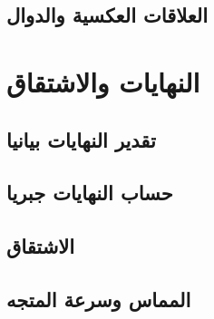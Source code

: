 \documentclass[12pt]{article}
\begin{document}
        \subsection{العلاقات العكسية والدوال}
    \section{النهايات والاشتقاق}
        \subsection{تقدير النهايات بيانيا}
        \subsection{حساب النهايات جبريا}
        \subsection{الاشتقاق}
        \subsection{المماس وسرعة المتجه}
\end{document}

